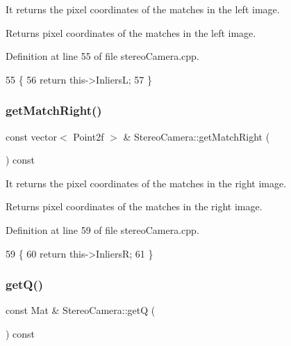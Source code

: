 It returns the pixel coordinates of the matches in the left image. 

\begin{DoxyReturn}{Returns}
pixel coordinates of the matches in the left image. 
\end{DoxyReturn}


Definition at line 55 of file stereo\+Camera.\+cpp.


\begin{DoxyCode}
55                                                         \{
56     \textcolor{keywordflow}{return} this->InliersL;
57 \}
\end{DoxyCode}
\mbox{\label{classStereoCamera_ac8b01bc577cc3de8e7e8bc246d5c50f0}} 
\subsubsection{\texorpdfstring{get\+Match\+Right()}{getMatchRight()}}
{\footnotesize\ttfamily const vector$<$ Point2f $>$ \& Stereo\+Camera\+::get\+Match\+Right (\begin{DoxyParamCaption}{ }\end{DoxyParamCaption}) const}



It returns the pixel coordinates of the matches in the right image. 

\begin{DoxyReturn}{Returns}
pixel coordinates of the matches in the right image. 
\end{DoxyReturn}


Definition at line 59 of file stereo\+Camera.\+cpp.


\begin{DoxyCode}
59                                                          \{
60     \textcolor{keywordflow}{return} this->InliersR;
61 \}
\end{DoxyCode}
\mbox{\label{classStereoCamera_a9f10e66261a0211e5d786abc3df8a70b}} 
\subsubsection{\texorpdfstring{get\+Q()}{getQ()}}
{\footnotesize\ttfamily const Mat \& Stereo\+Camera\+::getQ (\begin{DoxyParamCaption}{ }\end{DoxyParamCaption}) const}



